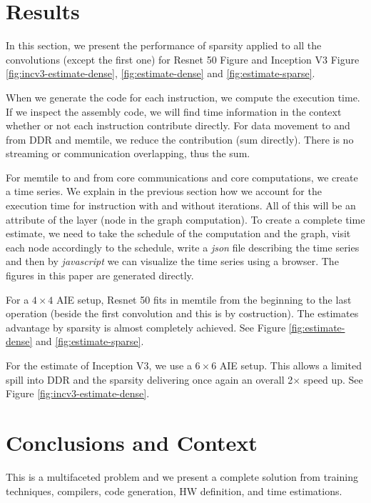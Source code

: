\documentclass[conference]{IEEEtran}
\begin{document}
\section{Results}
\label{sec:experiments}
In this section, we present the performance of sparsity applied to all
the convolutions (except the first one) for Resnet 50 Figure and
Inception V3 Figure \ref{fig:incv3-estimate-dense},
\ref{fig:estimate-dense} and \ref{fig:estimate-sparse}.


When we generate the code for each instruction, we compute the
execution time. If we inspect the assembly code, we will find time
information in the context whether or not each instruction contribute
directly. For data movement to and from DDR and memtile, we reduce the
contribution (sum directly). There is no streaming or communication
overlapping, thus the sum.

For memtile to and from core communications and core computations, we
create a time series. We explain in the previous section how we
account for the execution time for instruction with and without
iterations. All of this will be an attribute of the layer (node in the
graph computation).  To create a complete time estimate, we need to
take the schedule of the computation and the graph, visit each node
accordingly to the schedule, write a {\em json} file describing the
time series and then by {\em javascript} we can visualize the time
series using a browser. The figures in this paper are generated
directly.

For a $4\times 4$ AIE setup, Resnet 50 fits in memtile from the
beginning to the last operation (beside the first convolution and this
is by costruction). The estimates advantage by sparsity is almost
completely achieved.  See Figure \ref{fig:estimate-dense} and
\ref{fig:estimate-sparse}.

For the estimate of Inception V3, we use a $6\times 6$ AIE setup.
This allows a limited spill into DDR and the sparsity delivering once
again an overall 2$\times$ speed up. See Figure
\ref{fig:incv3-estimate-dense}.






\section{Conclusions and Context}
This is a multifaceted problem and we present a complete solution from
training techniques, compilers, code generation, HW definition, and
time estimations.
\end{document}
